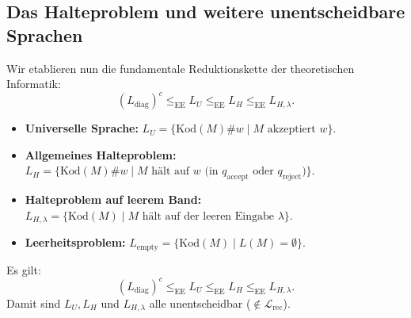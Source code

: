 \subsection{Das Halteproblem und weitere unentscheidbare Sprachen}

Wir etablieren nun die fundamentale Reduktionskette der theoretischen Informatik:
\[
    (L_{\mathrm{diag}})^c \le_{\mathrm{EE}} L_U \le_{\mathrm{EE}} L_H \le_{\mathrm{EE}} L_{H,\lambda}.
\]

\begin{definition}
    \begin{itemize}
        \item \textbf{Universelle Sprache:}
        $L_U = \{\mathrm{Kod}(M)\#w \mid M \text{ akzeptiert } w\}$.
        \item \textbf{Allgemeines Halteproblem:}
        $L_H = \{\mathrm{Kod}(M)\#w \mid M \text{ hält auf } w \text{ (in } q_{\mathrm{accept}} \text{ oder } q_{\mathrm{reject}})\}$.
        \item \textbf{Halteproblem auf leerem Band:}
        $L_{H,\lambda} = \{\mathrm{Kod}(M) \mid M \text{ hält auf der leeren Eingabe } \lambda\}$.
        \item \textbf{Leerheitsproblem:}
        $L_{\mathrm{empty}} = \{\mathrm{Kod}(M) \mid L(M) = \emptyset\}$.
    \end{itemize}
\end{definition}

\begin{theorem}
    Es gilt:
    \[
        (L_{\mathrm{diag}})^c \le_{\mathrm{EE}} L_U \le_{\mathrm{EE}} L_H \le_{\mathrm{EE}} L_{H,\lambda}.
    \]
    Damit sind $L_U, L_H$ und $L_{H,\lambda}$ alle unentscheidbar ($\notin \mathcal{L}_{\mathrm{rec}}$).
\end{theorem}

